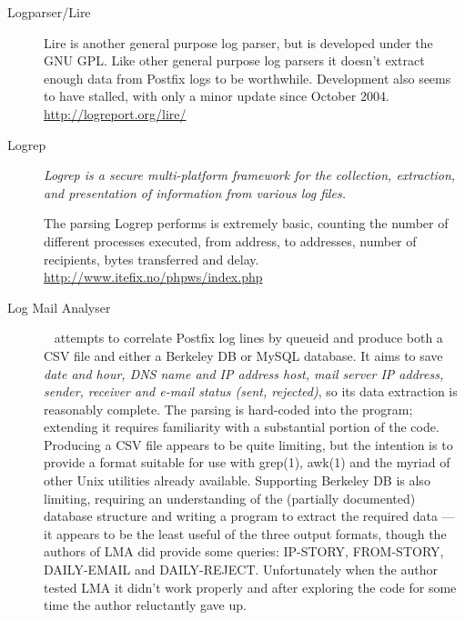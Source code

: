 \documentclass[a4paper,12pt,draft]{article}
\begin{document}
\begin{description}
    \item [Logparser/Lire] Lire is another general purpose log parser, but
        is developed under the GNU GPL\@.  Like other general purpose log
        parsers it doesn't extract enough data from Postfix logs to be
        worthwhile.  Development also seems to have stalled, with only a
        minor update since October 2004.  \newline
        \url{http://logreport.org/lire/}

    \item [Logrep] \textit{Logrep is a secure multi-platform framework for
        the collection, extraction, and presentation of information from
        various log files.\/}

        The parsing Logrep performs is extremely basic, counting the number
        of different processes executed, from address, to addresses, number
        of recipients, bytes transferred and delay.  \newline
        \url{http://www.itefix.no/phpws/index.php}

    \item [Log Mail Analyser]~\cite{log-mail-analyser} attempts to
        correlate Postfix log lines by queueid and produce both a CSV file
        and either a Berkeley DB or MySQL database.  It aims to save
        \textit{date and hour, DNS name and IP address host, mail server IP
        address, sender, receiver and e-mail status (sent, rejected)}, so
        its data extraction is reasonably complete.  The parsing is
        hard-coded into the program; extending it requires familiarity with
        a substantial portion of the code.  Producing a CSV file appears to
        be quite limiting, but the intention is to provide a format
        suitable for use with grep(1), awk(1) and the myriad of other Unix
        utilities already available.  Supporting Berkeley DB is also
        limiting, requiring an understanding of the (partially documented)
        database structure and writing a program to extract the required
        data --- it appears to be the least useful of the three output
        formats, though the authors of LMA did provide some queries:
        IP-STORY, FROM-STORY, DAILY-EMAIL and DAILY-REJECT\@.
        Unfortunately when the author tested LMA it didn't work properly
        and after exploring the code for some time the author reluctantly
        gave up.

\end{description}



\label{bibliography}

\end{document}
